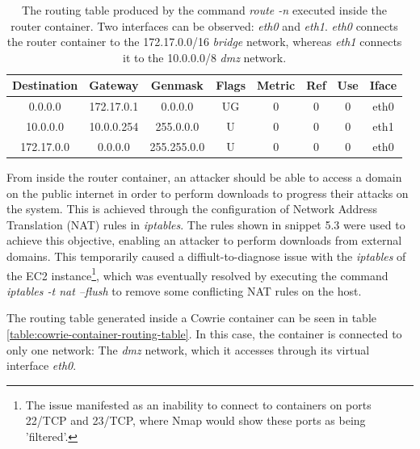 \begin{table}[!h]
	\begin{center}
		\begin{tabular}{|c|c|c|c|c|c|c|c|} 
			\hline
			\bf Destination  & \bf Gateway  & \bf Genmask  & \bf Flags & \bf Metric & \bf Ref & \bf Use & \bf Iface \\
			\hline
			0.0.0.0 & 172.17.0.1 & 0.0.0.0 & UG & 0 & 0 & 0 & eth0  \\
            10.0.0.0 & 10.0.0.254 & 255.0.0.0 & U & 0 & 0 & 0 & eth1  \\
            172.17.0.0 & 0.0.0.0 & 255.255.0.0 & U & 0 & 0 & 0 & eth0  \\
			\hline
		\end{tabular}
	\end{center}
	\caption[Routing Table of the Router Container]{The routing table produced by the command \textit{route -n} executed inside the router container. Two interfaces can be observed: \textit{eth0} and \textit{eth1}. \textit{eth0} connects the router container to the 172.17.0.0/16 \textit{bridge} network, whereas \textit{eth1} connects it to the 10.0.0.0/8 \textit{dmz} network.}	
	\label{table:router-routing-table}
\end{table}

From inside the router container, an attacker should be able to access a domain on the public internet in order to perform downloads to progress their attacks on the system. This is achieved through the configuration of Network Address Translation (NAT) rules in \textit{iptables}. The rules shown in snippet 5.3 were used to achieve this objective, enabling an attacker to perform downloads from external domains. This temporarily caused a diffiult-to-diagnose issue with the \textit{iptables} of the EC2 instance\footnote{The issue manifested as an inability to connect to containers on ports 22/TCP and 23/TCP, where Nmap would show these ports as being 'filtered'.}, which was eventually resolved by executing the command \textit{iptables -t nat --flush} to remove some conflicting NAT rules on the host.

\label{lst:nat-rules}

The routing table generated inside a Cowrie container can be seen in table \ref{table:cowrie-container-routing-table}. In this case, the container is connected to only one network: The \textit{dmz} network, which it accesses through its virtual interface \textit{eth0}.

